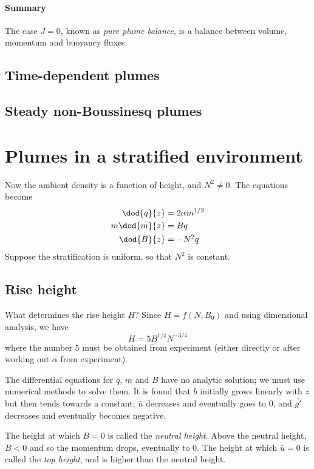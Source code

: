 \paragraph{Summary} The case $J=0$, known as \textit{pure plume balance}, is a
balance between volume, momentum and buoyancy fluxes. 

\subsection{Time-dependent plumes}
\subsection{Steady non-Boussinesq plumes}

\section{Plumes in a stratified environment}

Now the ambient density is a function of height, and $N^2 \neq 0$. The equations
become 
\begin{align}
    \dod{q}{z} &= 2\alpha m^{1/2} \\
    m\dod{m}{z} &= B q \\
    \dod{B}{z} &= -N^2 q
\end{align}
Suppose the stratification is uniform, so that $N^2$ is constant.

\subsection{Rise height}

What determines the rise height $H$? Since $H = f(N, B_0)$ and using dimensional
analysis, we have 
\begin{equation}
    H = 5 B^{1/4} N^{-3/4} 
\end{equation}
where the number $5$ must be obtained from experiment (either directly or after
working out $\alpha$ from experiment).

The differential equations for $q$, $m$ and $B$ have no analytic solution; we
must use numerical methods to solve them. It is found that $b$ initially grows
linearly with $z$ but then tends towards a constant; $\bar{u}$ decreases and
eventually goes to 0, and $\bar{g'}$ decreases and eventually becomes negative.

The height at which $B = 0$ is called the \textit{neutral height}. Above the
neutral height, $B < 0$ and so the momentum drops, eventually to 0. The height
at which $\bar{u} = 0$ is called the \textit{top height}, and is higher than the
neutral height.

